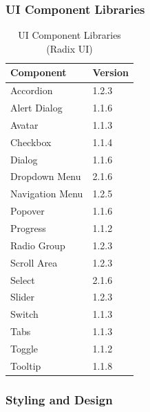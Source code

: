 \documentclass[12pt,a4paper]{article}
\begin{document}
    \subsubsection{UI Component Libraries}

    \begin{table}[H]
        \caption{UI Component Libraries (Radix UI)}
        \begin{tabular}{|l|l|}
            \hline
            \textbf{Component} & \textbf{Version} \\
            \hline
            Accordion & 1.2.3 \\
            Alert Dialog & 1.1.6 \\
            Avatar & 1.1.3 \\
            Checkbox & 1.1.4 \\
            Dialog & 1.1.6 \\
            Dropdown Menu & 2.1.6 \\
            Navigation Menu & 1.2.5 \\
            Popover & 1.1.6 \\
            Progress & 1.1.2 \\
            Radio Group & 1.2.3 \\
            Scroll Area & 1.2.3 \\
            Select & 2.1.6 \\
            Slider & 1.2.3 \\
            Switch & 1.1.3 \\
            Tabs & 1.1.3 \\
            Toggle & 1.1.2 \\
            Tooltip & 1.1.8 \\
            \hline
        \end{tabular}
    \end{table}

    \subsubsection{Styling and Design}
\end{document}
